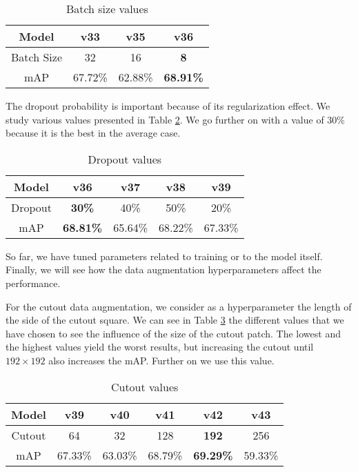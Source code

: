     \begin{table}[H]
    \centering
    \caption{Batch size values}
    
    \begin{tabular}{c|ccc}
Model      & v33                         & v35                         & \textbf{v36}                         \\ \hline
Batch Size & 32                          & 16                          & \textbf{8}                           \\ \hline
mAP        & \multicolumn{1}{l}{67.72\%} & \multicolumn{1}{l}{62.88\%} & \multicolumn{1}{l}{\textbf{68.91\%}}
\end{tabular}
    \label{bs_values_table}
    \end{table}
    
    The dropout probability is important because of its regularization effect. We study various values presented in Table \ref{dropout_values_table}. We go further on with a value of 30\% because it is the best in the average case.
    

    \begin{table}[H]
    \caption{Dropout values}
    
    \centering
\begin{tabular}{c|cccc}
Model   & \textbf{v36}     & v37     & v38     & v39     \\ \hline
Dropout & \textbf{30\%}    & 40\%    & 50\%    & 20\%    \\ \hline
mAP     & \textbf{68.81\%} & 65.64\% & 68.22\% & 67.33\%
\end{tabular}
    \label{dropout_values_table}
    \end{table}
    
    So far, we have tuned parameters related to training or to the model itself. Finally, we will see how the data augmentation hyperparameters affect the performance.
    
    
    For the cutout data augmentation, we consider as a hyperparameter the length of the side of the cutout square. We can see in Table \ref{cutout_values_table} the different values that we have chosen to see the influence of the size of the cutout patch. The lowest and the highest values yield the worst results, but increasing the cutout until $192 \times 192$ also increases the mAP. Further on we use this value.
    
    \begin{table}[H]
     \caption{Cutout values}
    \centering
\begin{tabular}{c|ccccc}
Model  & v39     & v40     & v41     & \textbf{v42}      & v43     \\ \hline
Cutout & 64      & 32      & 128     & \textbf{192}     & 256     \\ \hline
mAP    & 67.33\% & 63.03\% & 68.79\% & \textbf{69.29\%} & 59.33\%
\end{tabular}
    
    \label{cutout_values_table}
    \end{table}
    
